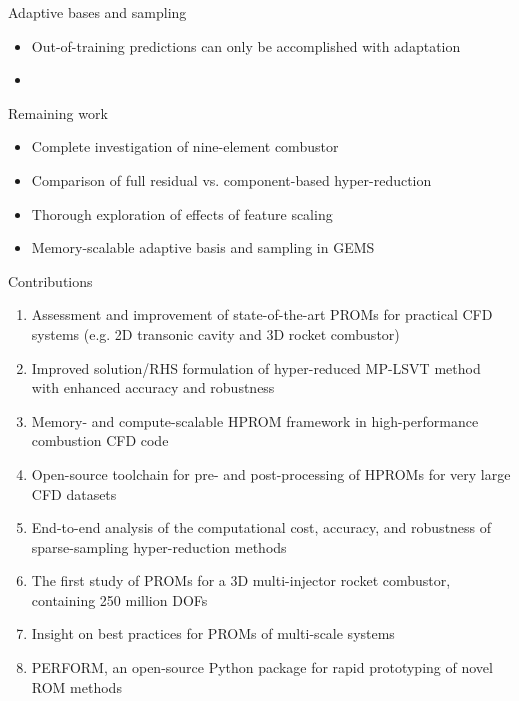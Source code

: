 \documentclass[]{beamer}
\begin{document}
\begin{frame}{Adaptive bases and sampling}
	\begin{itemize}
		\item Out-of-training predictions can only be accomplished with adaptation
		\item  
	\end{itemize}
\end{frame}

\begin{frame}{Remaining work}
	\begin{itemize}
		\item Complete investigation of nine-element combustor
		\item Comparison of full residual vs. component-based hyper-reduction
		\item Thorough exploration of effects of feature scaling
		\item Memory-scalable adaptive basis and sampling in GEMS
	\end{itemize}
\end{frame}

\begin{frame}{Contributions}
    \begin{enumerate}
        \item Assessment and improvement of state-of-the-art PROMs for practical CFD systems (e.g. 2D transonic cavity and 3D rocket combustor)
        \item Improved solution/RHS formulation of hyper-reduced MP-LSVT method with enhanced accuracy and robustness
        \item Memory- and compute-scalable HPROM framework in high-performance combustion CFD code
        \item Open-source toolchain for pre- and post-processing of HPROMs for very large CFD datasets
        \item End-to-end analysis of the computational cost, accuracy, and robustness of sparse-sampling hyper-reduction methods
        \item The first study of PROMs for a 3D multi-injector rocket combustor, containing 250 million DOFs
        \item Insight on best practices for PROMs of multi-scale systems
        \item PERFORM, an open-source Python package for rapid prototyping of novel ROM methods
    \end{enumerate}
\end{frame}
\end{document}
